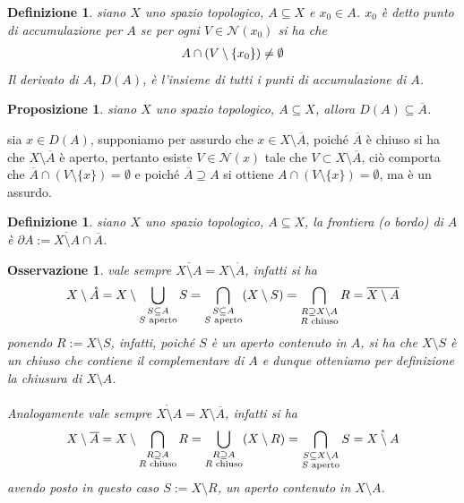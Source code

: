 \documentclass[oneside, 11pt]{amsbook}
\makeatletter
\newcommand{\0}{{(0)}}
\newcommand{\3}{{(3)}}
\theoremstyle{colonplain}
\newtheorem{prop}[thm]{Proposizione}
\theoremstyle{colondefinition}
\newtheorem{defn}[thm]{Definizione}
\theoremstyle{colonremark}
\newtheorem{rmk}[thm]{Osservazione}
\numberwithin{equation}{chapter}
\renewcommand{\proofname}{Dimostrazione}
\renewenvironment{proof}[1][\proofname]{\par
  \pushQED{\qed}%
  \normalfont \topsep6\p@\@plus6\p@\relax
  \trivlist
  \item[\hskip\labelsep\bfseries #1:]\ignorespaces
}{%
  \popQED\endtrivlist\@endpefalse
}
\makeatother
\begin{document}
\begin{defn}
siano $X$ uno spazio topologico, $A \subseteq X$ e $x_0 \in A$. $x_0$ è detto \textit{punto di accumulazione} per $A$ se per ogni $V \in \mathcal{N}(x_0)$ si ha che
\begin{align}
    A \cap (V \setminus \{ x_0 \}) \neq \emptyset \notag
\end{align}
Il \textit{derivato di $A$}, $D(A)$, è l'insieme di tutti i punti di accumulazione di $A$.
\end{defn}
\begin{prop}
siano $X$ uno spazio topologico, $A \subseteq X$, allora $D(A) \subseteq \overline{A}$.
\end{prop}
\begin{proof}
sia $x \in D(A)$, supponiamo per assurdo che $x \in X \setminus \overline{A}$, poiché $\overline{A}$ è chiuso si ha che $X \setminus \overline{A}$ è aperto, pertanto esiste $V \in \mathcal{N}(x)$ tale che $V \subset X \setminus \overline{A}$, ciò comporta che $\overline{A} \cap (V \setminus \{x\}) = \emptyset$ e poiché $\overline{A} \supseteq A$ si ottiene $A \cap (V \setminus \{x\}) = \emptyset$, ma è un assurdo.
\end{proof}
\begin{defn}
siano $X$ uno spazio topologico, $A \subseteq X$, la \textit{frontiera} (o \textit{bordo}) di $A$ è $\partial A := \overline{X \setminus A} \cap \overline{A}$.
\end{defn}
\begin{rmk}
vale sempre $\overline{X \setminus A} = X \setminus \mathring{A}$, infatti si ha 
\begin{align}
    X \setminus \mathring{A} = X \setminus \bigcup_{\substack{S \subseteq A \\ S \text{ aperto}}} S = \bigcap_{\substack{S \subseteq A \\ S \text{ aperto}}} (X \setminus S) = \bigcap_{\substack{R \supseteq X \setminus A \\ R \text{ chiuso}}} R = \overline{X \setminus A} \notag
\end{align}
ponendo $R := X \setminus S$, infatti, poiché $S$ è un aperto contenuto in $A$, si ha che $X \setminus S$ è un chiuso che contiene il complementare di $A$ e dunque otteniamo per definizione la chiusura di $X \setminus A$. \\ \\
Analogamente vale sempre $\mathring{X \setminus A} = X \setminus \overline{A}$, infatti si ha
\begin{align}
    X \setminus \overline{A} = X \setminus \bigcap_{\substack{R \supseteq A \\ R \text{ chiuso}}} R = \bigcup_{\substack{R \supseteq A \\ R \text{ chiuso}}} (X \setminus R) = \bigcap_{\substack{S \subseteq X \setminus A \\ S \text{ aperto}}} S = \mathring{X \setminus A} \notag
\end{align}
avendo posto in questo caso $S := X \setminus R$, un aperto contenuto in $X \setminus A$.
\end{rmk}
\end{document}
